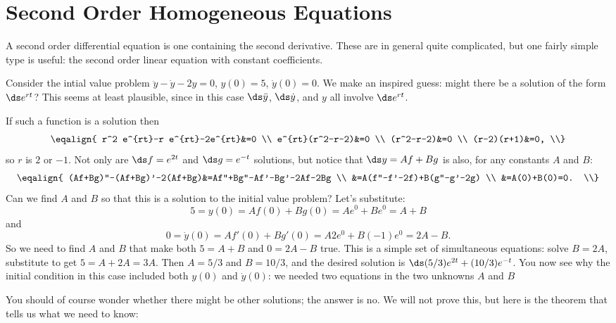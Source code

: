 \section{Second Order Homogeneous Equations}{}{}
\label{sec:second order homogeneous}
\nobreak
A second order differential equation is one containing the second
derivative. These are in general quite complicated, but one fairly
simple type is useful: the second order linear equation with constant
coefficients. 

\begin{example} Consider the intial value problem $\ddot y-\dot y-2y=0$,
$y(0)=5$, $\dot y(0)=0$. We make an inspired guess: might there be a
solution of the form $\ds e^{rt}$? This seems at least plausible,
since in this case $\ds\ddot y$, $\ds\dot y$, and $y$ all
involve $\ds e^{rt}$. 

If such a function is a solution then
$$\eqalign{
r^2 e^{rt}-r e^{rt}-2e^{rt}&=0 \\
e^{rt}(r^2-r-2)&=0 \\
(r^2-r-2)&=0 \\
(r-2)(r+1)&=0, \\}
$$
so $r$ is $2$ or $-1$. Not only are $\ds f=e^{2t}$ and $\ds g=e^{-t}$
solutions, but notice that $\ds y=Af+Bg$ is also, for any constants $A$
and $B$:
$$\eqalign{
(Af+Bg)''-(Af+Bg)'-2(Af+Bg)&=Af''+Bg''-Af'-Bg'-2Af-2Bg \\
&=A(f''-f'-2f)+B(g''-g'-2g) \\
&=A(0)+B(0)=0. \\}
$$
Can we find $A$ and $B$ so that this is a solution to the initial
value problem? Let's substitute:
$$
5=y(0)=Af(0)+Bg(0)=Ae^0+Be^0=A+B
$$
and 
$$0=\dot y(0)=Af'(0)+Bg'(0)=A2e^{0}+B(-1)e^0=2A-B.$$
So we need to find $A$ and $B$ that make both $5=A+B$ and $0=2A-B$
true. This is a simple set of simultaneous equations: solve $B=2A$,
substitute to get $5=A+2A=3A$. Then $A=5/3$ and $B=10/3$, and the
desired solution is $\ds (5/3)e^{2t}+(10/3)e^{-t}$. You now see why
the initial condition in this case included both $y(0)$ and $\dot
y(0)$: we needed two equations in the two unknowns $A$ and $B$
\end{example}

You should of course wonder whether there might be other solutions;
the answer is no. We will not prove this, but here is the theorem that
tells us what we need to know:

